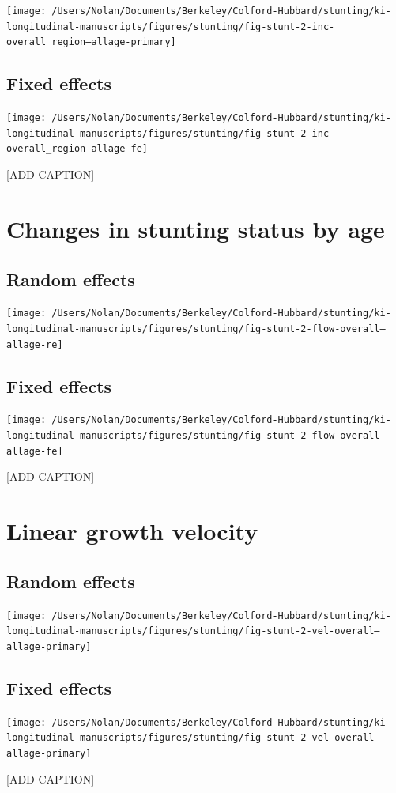 \documentclass[9pt,]{book}
\begin{document}
\texttt{[image: /Users/Nolan/Documents/Berkeley/Colford-Hubbard/stunting/ki-longitudinal-manuscripts/figures/stunting/fig-stunt-2-inc-overall\_region--allage-primary]}

\subsection{Fixed effects}\label{fixed-effects-1}

\texttt{[image: /Users/Nolan/Documents/Berkeley/Colford-Hubbard/stunting/ki-longitudinal-manuscripts/figures/stunting/fig-stunt-2-inc-overall\_region--allage-fe]}

{[}ADD CAPTION{]}

\section{Changes in stunting status by
age}\label{changes-in-stunting-status-by-age}

\subsection{Random effects}\label{random-effects-2}

\texttt{[image: /Users/Nolan/Documents/Berkeley/Colford-Hubbard/stunting/ki-longitudinal-manuscripts/figures/stunting/fig-stunt-2-flow-overall--allage-re]}

\subsection{Fixed effects}\label{fixed-effects-2}

\texttt{[image: /Users/Nolan/Documents/Berkeley/Colford-Hubbard/stunting/ki-longitudinal-manuscripts/figures/stunting/fig-stunt-2-flow-overall--allage-fe]}

{[}ADD CAPTION{]}

\section{Linear growth velocity}\label{linear-growth-velocity-1}

\subsection{Random effects}\label{random-effects-3}

\texttt{[image: /Users/Nolan/Documents/Berkeley/Colford-Hubbard/stunting/ki-longitudinal-manuscripts/figures/stunting/fig-stunt-2-vel-overall--allage-primary]}

\subsection{Fixed effects}\label{fixed-effects-3}

\texttt{[image: /Users/Nolan/Documents/Berkeley/Colford-Hubbard/stunting/ki-longitudinal-manuscripts/figures/stunting/fig-stunt-2-vel-overall--allage-primary]}

{[}ADD CAPTION{]}


\end{document}
